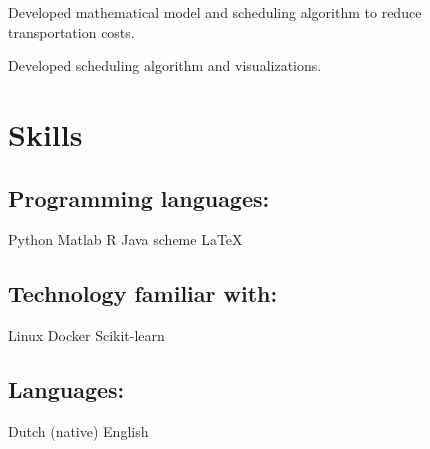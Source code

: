 \documentclass[]{deedy-resume-openfont}
\begin{document}
Developed mathematical model and scheduling algorithm to reduce transportation costs.


\sectionsep

Developed scheduling algorithm and visualizations.
\sectionsep



\section{Skills}
\subsection{Programming languages:}
  Python \textbullet{}  Matlab \textbullet{}
 R \textbullet{} Java \textbullet{} scheme \textbullet{} \LaTeX\ \\ 
 \vspace{\topsep} %
\subsection{Technology familiar with:}
Linux \textbullet{} Docker \textbullet{} Scikit-learn
 \vspace{\topsep} %
\subsection{Languages:}
Dutch (native) \textbullet{} English
\sectionsep
\end{document}
